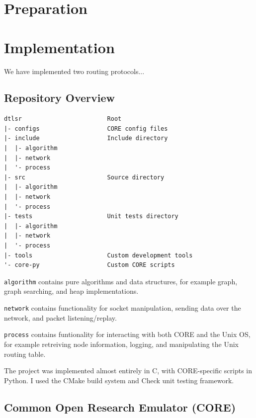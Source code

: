 \documentclass[10pt,twoside,a4paper]{article}
\begin{document}
\section{Preparation}

\section{Implementation}

We have implemented two routing protocols...

\subsection{Repository Overview}

\begin{verbatim}
dtlsr                        Root
|- configs                   CORE config files
|- include                   Include directory
|  |- algorithm
|  |- network
|  '- process
|- src                       Source directory
|  |- algorithm
|  |- network
|  '- process
|- tests                     Unit tests directory
|  |- algorithm
|  |- network
|  '- process
|- tools                     Custom development tools
'- core-py                   Custom CORE scripts
\end{verbatim}

\texttt{algorithm} contains pure algorithms and data structures, for example graph, graph searching, and heap implementations.

\texttt{network} contains functionality for socket manipulation, sending data over the network, and packet listening/replay.

\texttt{process} contains funtionality for interacting with both CORE and the Unix OS, for example retreiving node information, logging, and manipulating the Unix routing table.

The project was implemented almost entirely in C, with CORE-specific scripts in Python. I used the CMake build system and Check unit testing framework.


\subsection{Common Open Research Emulator (CORE)}
\end{document}
